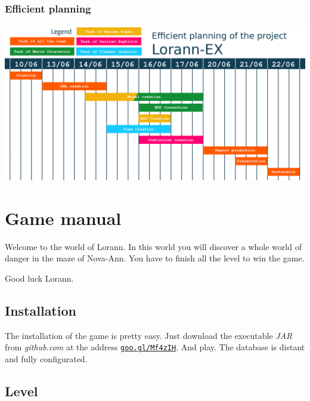 \documentclass{report}
\begin{document}
\subsection{Efficient planning}

\begin{center}
\includegraphics[scale=0.75]{resources/Planning-effectif.png}
\end{center}

\chapter{Game manual}

Welcome to the world of Lorann. In this world you will discover a whole world of danger in the maze of Nova-Ann. You have to finish all the level to win the game.

Good luck Lorann.

\section{Installation}

The installation of the game is pretty easy. Just download the executable \emph{JAR} from \emph{github.com} at the address \texttt{\href{https://github.com/EpicKiwi/Lorann-Ex/releases/download/0.0.2/Lorann-Ex-0.0.2-SNAPSHOT.jar}{goo.gl/Mf4zIH}}. And play. The database is distant and fully configurated.

\section{Level}
\end{document}
